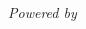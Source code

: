 \documentclass[10pt,a4paper]{article}
\begin{document}
\begin{CJK*}{UTF8}{gbsn}
  \CJKindent
  \pagestyle{headings}
  \title{}
  \author{孙伟}
  \maketitle

  \begin{flushright}
    \emph{Powered by }\LaTeXe{}
  \end{flushright}
\end{CJK*}
\end{document}
